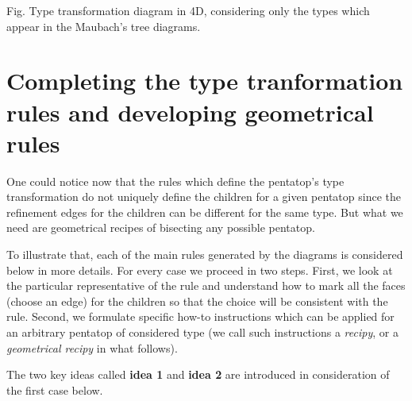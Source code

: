 \documentclass[a4paper,12pt]{amsart}
\numberwithin{equation}{section}
\begin{document}
\begin{center}
\newline
Fig. Type transformation diagram in 4D, considering only the types which appear in the Maubach's tree diagrams.
\end{center}

\section{Completing the type tranformation rules and developing geometrical rules}

One could notice now that the rules which define the pentatop's type transformation do not uniquely define the children for a given pentatop since the refinement edges for the children can be different for the same type. But what we need are geometrical recipes of bisecting any possible pentatop.

To illustrate that, each of the main rules generated by the diagrams is considered below in more details. For every case we proceed in two steps. First, we look at the particular representative of the rule and understand how to mark all the faces (choose an edge) for the children so that the choice will be consistent with the rule. Second, we formulate specific how-to instructions which can be applied for an arbitrary pentatop of considered type (we call such instructions a \textit{recipy}, or a \textit{geometrical recipy} in what follows).

The two key ideas called \textbf{idea 1} and \textbf{idea 2} are introduced in consideration of the first case below.
\end{document}
